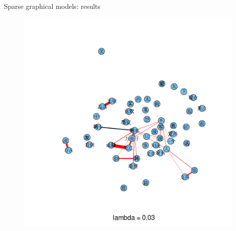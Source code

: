 \documentclass[12pt, trans]{beamer}
\newcommand{\1}[1]{{\mathbf 1}\left\{#1\right\}}        %
\begin{document}
\begin{frame}{Sparse graphical models: results}

\begin{figure}
  \centering
  \includegraphics[height=0.9\textheight]{./../../gLassoResults/glasso6.png} 
\end{figure}

\end{frame}
\end{document}
